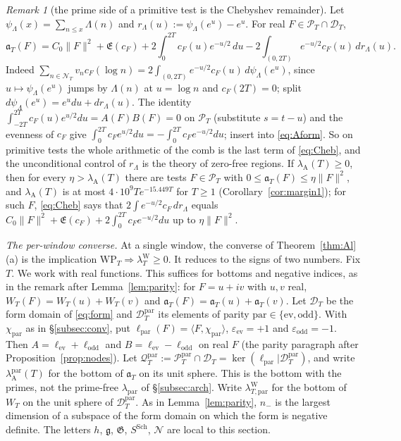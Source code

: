 \documentclass[11pt]{amsart}
\theoremstyle{definition}
\theoremstyle{remark}
\newtheorem{remark}[theorem]{Remark}
\newcommand{\PT}{\mathcal P_T}
\newcommand{\lamW}{\lambda^{\mathrm W}_T}
\newcommand{\lamA}{\lambda_{\mathrm A}(T)}
\newcommand{\cF}{c_F}
\newcommand{\Lev}{\mathfrak E}
\newcommand{\NT}{\mathcal N_T}
\begin{document}
\begin{remark}[the prime side of a primitive test is the Chebyshev remainder]\label{rem:Cheb}
Let $\psi_\Lambda(x)=\sum_{n\le x}\Lambda(n)$ and $r_\Lambda(u):=\psi_\Lambda(e^u)-e^u$. For real $F\in\PT\cap\mathcal D_T$,
\begin{equation}\label{eq:Cheb}
\mathfrak a_T(F)=C_0\|F\|^2+\Lev(\cF)+2\int_0^{2T}\cF(u)e^{-u/2}\,du-2\int_{(0,2T)}e^{-u/2}\cF(u)\,dr_\Lambda(u).
\end{equation}
Indeed $\sum_{n\in\NT}v_n\cF(\log n)=2\int_{(0,2T)}e^{-u/2}\cF(u)\,d\psi_\Lambda(e^u)$, since $u\mapsto\psi_\Lambda(e^u)$
jumps by $\Lambda(n)$ at $u=\log n$ and $\cF(2T)=0$; split $d\psi_\Lambda(e^u)=e^udu+dr_\Lambda(u)$. The identity
$\int_{-2T}^{2T}\cF(u)e^{u/2}du=A(F)B(F)=0$ on $\PT$ (substitute $s=t-u$) and the evenness of $\cF$ give
$\int_0^{2T}\cF e^{u/2}du=-\int_0^{2T}\cF e^{-u/2}du$; insert into \eqref{eq:Aform}. So on primitive tests the whole
arithmetic of the comb is the last term of \eqref{eq:Cheb}, and the unconditional control of $r_\Lambda$ is the
theory of zero-free regions. If $\lamA\ge0$, then for every $\eta>\lamA$ there are tests $F\in\PT$ with
$0\le\mathfrak a_T(F)\le\eta\|F\|^2$, and $\lamA$ is at most $4\cdot10^9Te^{-15.449T}$ for $T\ge1$
(Corollary~\ref{cor:margin1}); for such $F$, \eqref{eq:Cheb} says that $2\int e^{-u/2}\cF\,dr_\Lambda$ equals
$C_0\|F\|^2+\Lev(\cF)+2\int_0^{2T}\cF e^{-u/2}du$ up to $\eta\|F\|^2$.
\end{remark}


\emph{The per-window converse.} At a single window, the converse of Theorem~\ref{thm:Al}(a) is the
implication $\mathrm{WP}_T\Rightarrow\lamW\ge0$. It reduces to the signs of two numbers. Fix $T$. We work
with real functions. This suffices for bottoms and negative indices, as in the remark after
Lemma~\ref{lem:parity}: for $F=u+iv$ with $u,v$ real, $W_T(F)=W_T(u)+W_T(v)$ and
$\mathfrak a_T(F)=\mathfrak a_T(u)+\mathfrak a_T(v)$. Let $\mathcal D_T$ be the form domain of \eqref{eq:form}
and $\mathcal D^{\mathrm{par}}_T$ its elements of parity $\mathrm{par}\in\{\mathrm{ev},\mathrm{odd}\}$. With
$\chi_{\mathrm{par}}$ as in \S\ref{subsec:conv}, put
$\ell_{\mathrm{par}}(F)=\langle F,\chi_{\mathrm{par}}\rangle$, $\varepsilon_{\mathrm{ev}}=+1$ and
$\varepsilon_{\mathrm{odd}}=-1$. Then $A=\ell_{\mathrm{ev}}+\ell_{\mathrm{odd}}$ and
$B=\ell_{\mathrm{ev}}-\ell_{\mathrm{odd}}$ on real $F$ (the parity paragraph after
Proposition~\ref{prop:nodes}). Let $\mathcal Q^{\mathrm{par}}_T:=\PT^{\mathrm{par}}\cap\mathcal D_T
=\ker(\ell_{\mathrm{par}}|\mathcal D^{\mathrm{par}}_T)$, and write $\lambda^{\mathrm{par}}_{\mathrm A}(T)$ for the
bottom of $\mathfrak a_T$ on its unit sphere. This is the bottom with the primes, not the prime-free
$\lambda_{\mathrm{par}}$ of \S\ref{subsec:arch}. Write $\lambda^{\mathrm W}_{T,\mathrm{par}}$ for the bottom of
$W_T$ on the unit sphere of $\mathcal D^{\mathrm{par}}_T$. As in Lemma~\ref{lem:parity}, $n_-$ is the largest
dimension of a subspace of the form domain on which the form is negative definite. The letters $h$,
$\mathfrak g$, $\mathfrak G$, $S^{\mathrm{Sch}}$, $\mathcal N$ are local to this section.
\end{document}
